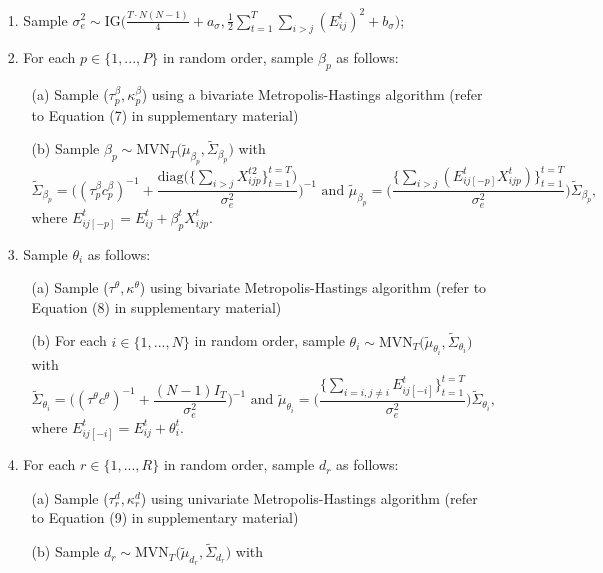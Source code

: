 \documentclass[a4paper]{article}
\begin{document}
	\begin{itemize}
		\item [1.] Sample $\sigma_e^2 \sim \mbox{IG}\big(\frac{T\cdot N(N-1)}{4}+a_\sigma, \frac{1}{2}\sum\limits_{t=1}^T\sum\limits_{i> j}(E^t_{ij})^2 + b_\sigma\big)$;
		\item [2.] For each $p \in \{1,...,P\}$ in random order, sample $\beta_{p}$ as follows:
		\begin{enumerate} 
			\item [(a)] Sample ($\tau^{\beta}_p ,  \kappa^\beta_p$) using a bivariate Metropolis-Hastings algorithm (refer to Equation (7) in supplementary material)
			\item [(b)] Sample $\beta_{p} \sim \mbox{MVN}_T\big(\tilde{\mu}_{\beta_p}, \tilde{\Sigma}_{\beta_p} \big)$ with 
			$$\tilde{\Sigma}_{\beta_p} = \Big((\tau^{\beta}_pc^\beta_p)^{-1}+\frac{\mbox{diag}\big(\{\sum_{i>j}{X^{t2}_{ijp}}\}_{t=1}^{t=T}\big)}{\sigma_e^2}\Big)^{-1} \mbox{ and } \tilde{\mu}_{\beta_p} =  \Big(\frac{\{\sum_{i>j}(E^{t}_{ij[-p]}X^t_{ijp})\}_{t=1}^{t=T}}{\sigma_e^2}\Big)\tilde{\Sigma}_{\beta_p},$$ 
			where $E^{t}_{ij[-p]}=E^t_{ij}+\beta^t_{p}X^{t}_{ijp}$.						
		\end{enumerate}
		\item [3.] Sample $\theta_{i}$ as follows:
		\begin{enumerate}
			\item [(a)] Sample ($\tau^{\theta},  \kappa^\theta$) using bivariate Metropolis-Hastings algorithm (refer to Equation (8) in supplementary material)
			\item [(b)] For each $i \in \{1,...,N\}$ in random order, sample $\theta_{i} \sim \mbox{MVN}_T\big(\tilde{\mu}_{\theta_i}, \tilde{\Sigma}_{\theta_i} \big)$ with
			$$\tilde{\Sigma}_{\theta_i} = \Big((\tau^\theta c^\theta)^{-1}+\frac{(N-1)I_T}{\sigma_e^2}\Big)^{-1} \mbox{ and }
			\tilde{\mu}_{\theta_i} = \Big(\frac{\{\sum_{i=i, j\neq i}E^{t}_{ij[-i]}\}_{t=1}^{t=T}}{\sigma_e^2}\Big)\tilde{\Sigma}_{\theta_i},$$ where $E^{t}_{ij[-i]}=E^t_{ij}+\theta^t_{i}.$
		\end{enumerate}
		\item [4.] For each $r \in \{1,...,R\}$ in random order, sample $d_{r}$ as follows:
		\begin{enumerate}
			\item [(a)] Sample  ($\tau_r^{d},  \kappa_r^d$)  using univariate Metropolis-Hastings algorithm (refer to Equation (9) in supplementary material)
			\item [(b)] Sample $d_{r} \sim \mbox{MVN}_T\big(\tilde{\mu}_{d_r}, \tilde{\Sigma}_{d_r} \big)$ with

\end{enumerate}
\end{itemize}
\end{document}

